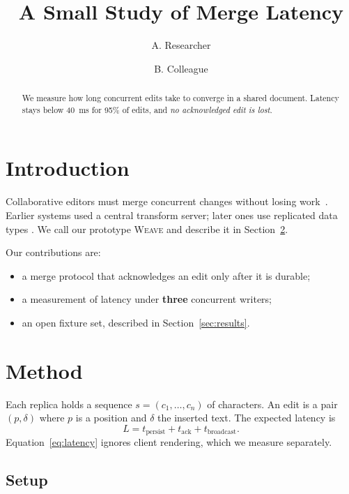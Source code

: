 \documentclass[11pt]{article}
\title{A Small Study of Merge Latency}
\author{A. Researcher \and B. Colleague}
\date{}
\newcommand{\method}{\textsc{Weave}}
\begin{document}
\maketitle

\begin{abstract}
We measure how long concurrent edits take to converge in a shared document.
Latency stays below 40~ms for 95\% of edits, and \emph{no acknowledged edit is lost}.
\end{abstract}

\section{Introduction}
\label{sec:intro}

Collaborative editors must merge concurrent changes without losing work~\cite{shapiro2011}.
Earlier systems used a central transform server; later ones use replicated data
types \cite{nicolaescu2016,shapiro2011}. %
We call our prototype \method{} and describe it in Section~\ref{sec:method}.

Our contributions are:
\begin{itemize}
  \item a merge protocol that acknowledges an edit only after it is durable;
  \item a measurement of latency under \textbf{three} concurrent writers;
  \item an open fixture set, described in Section~\ref{sec:results}.
\end{itemize}

\section{Method}
\label{sec:method}

Each replica holds a sequence $s = (c_1, \dots, c_n)$ of characters. An edit is a
pair $(p, \delta)$ where $p$ is a position and $\delta$ the inserted text.
The expected latency is
\begin{equation}
  \label{eq:latency}
  L = t_{\text{persist}} + t_{\text{ack}} + t_{\text{broadcast}} .
\end{equation}
Equation~\eqref{eq:latency} ignores client rendering, which we measure separately.

\subsection{Setup}
\end{document}
